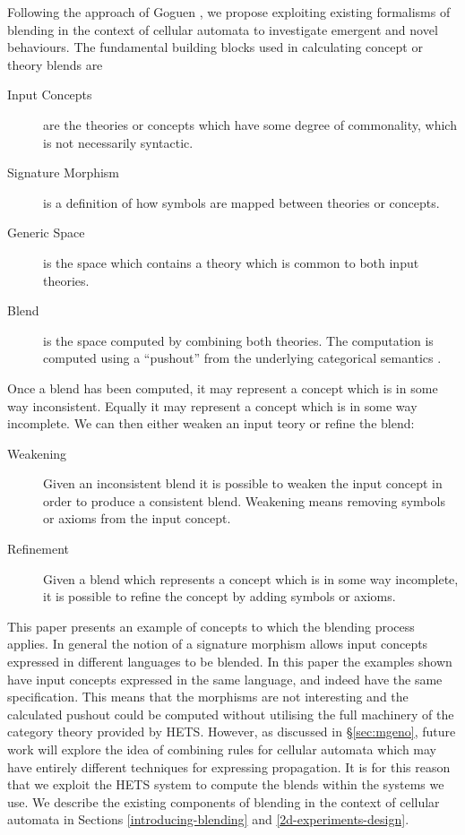 \documentclass{AISB2008}
\begin{document}
Following the approach of Goguen \cite{gog05}, we propose exploiting
existing formalisms of blending in the context of cellular automata to
investigate emergent and novel behaviours. The fundamental building blocks used in calculating concept or theory blends are
\begin{description}
\item[Input Concepts] are the theories or concepts which have some degree of commonality, which is not necessarily syntactic. 
\item[Signature Morphism] is a definition of how symbols are mapped between theories or concepts. 
\item[Generic Space] is the space which contains a theory which is common to both input theories.
\item[Blend] is the space computed by combining both theories. The computation is computed using a ``pushout'' from the underlying categorical semantics \cite{MossakowskiEA06}. 
\end{description}

Once a blend has been computed, it may represent a concept which is in some way inconsistent. Equally it may represent a concept which is in some way incomplete. We can then either weaken an input teory or refine the blend:
\begin{description}
\item[Weakening] Given an inconsistent blend it is possible to weaken the input concept in order to produce a consistent blend. Weakening means removing symbols or axioms from the input concept.
\item[Refinement] Given a blend which represents a concept which is in some way incomplete, it is possible to refine the concept by adding symbols or axioms.
\end{description}

This paper presents an example of concepts to which the blending
process applies. In general the notion of a signature morphism allows
input concepts expressed in different languages to be blended. In this
paper the examples shown have input concepts expressed in the same
language, and indeed have the same specification. This means that the
morphisms are not interesting and the calculated pushout could be
computed without utilising the full machinery of the category theory
provided by HETS. However, as discussed in \S\ref{sec:mgeno}, future work
will explore the idea of combining rules for cellular automata which
may have entirely different techniques for expressing propagation. It
is for this reason that we exploit the HETS system to compute the
blends within the systems we use. We describe the existing components
of blending in the context of cellular automata in Sections
\ref{introducing-blending} and \ref{2d-experiments-design}.
\end{document}
